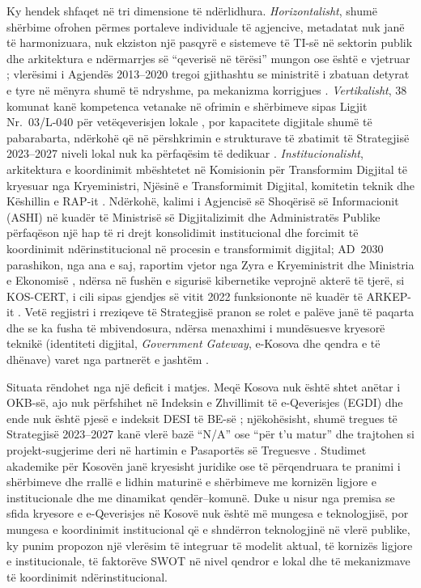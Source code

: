 \documentclass[conference]{IEEEtran}
\begin{document}
Ky hendek shfaqet në tri dimensione të ndërlidhura. \textit{Horizontalisht},
shumë shërbime ofrohen përmes portaleve individuale të agjencive, metadatat
nuk janë të harmonizuara, nuk ekziston një pasqyrë e sistemeve të TI-së në
sektorin publik dhe arkitektura e ndërmarrjes së ``qeverisë në tërësi''
mungon ose është e vjetruar \cite{strategjia2023}; vlerësimi i Agjendës
2013--2020 tregoi gjithashtu se ministritë i zbatuan detyrat e tyre në
mënyra shumë të ndryshme, pa mekanizma korrigjues \cite{agjenda2030}.
\textit{Vertikalisht}, 38 komunat kanë kompetenca vetanake në ofrimin e
shërbimeve sipas Ligjit Nr.~03/L-040 për vetëqeverisjen lokale
\cite{ligji03L040}, por kapacitete digjitale shumë të pabarabarta, ndërkohë
që në përshkrimin e strukturave të zbatimit të Strategjisë 2023--2027 niveli
lokal nuk ka përfaqësim të dedikuar \cite{strategjia2023}.
\textit{Institucionalisht}, arkitektura e koordinimit
mbështetet në Komisionin për Transformim Digjital të
kryesuar nga Kryeministri, Njësinë e Transformimit
Digjital, komitetin teknik dhe Këshillin e RAP-it
\cite{strategjia2023}. Ndërkohë, kalimi i Agjencisë
së Shoqërisë së Informacionit (ASHI) në kuadër të
Ministrisë së Digjitalizimit dhe Administratës Publike
përfaqëson një hap të ri drejt konsolidimit institucional
dhe forcimit të koordinimit ndërinstitucional në
procesin e transformimit digjital; AD~2030 parashikon, nga ana e saj, raportim vjetor
nga Zyra e Kryeministrit dhe Ministria e Ekonomisë \cite{agjenda2030},
ndërsa në fushën e sigurisë kibernetike veprojnë akterë të tjerë, si
KOS-CERT, i cili sipas gjendjes së vitit 2022 funksiononte në kuadër të
ARKEP-it \cite{kipred2022}. Vetë regjistri i rreziqeve
të Strategjisë pranon se rolet e palëve janë të paqarta dhe se ka fusha të
mbivendosura, ndërsa menaxhimi i mundësuesve kryesorë teknikë (identiteti
digjital, \textit{Government Gateway}, e-Kosova dhe qendra e të dhënave)
varet nga partnerët e jashtëm \cite{strategjia2023}.

Situata rëndohet nga një deficit i matjes. Meqë Kosova nuk është shtet
anëtar i OKB-së, ajo nuk përfshihet në Indeksin e Zhvillimit të
e-Qeverisjes (EGDI) \cite{undesa2024} dhe ende nuk është pjesë e indeksit
DESI të BE-së \cite{agjenda2030}; njëkohësisht, shumë tregues të Strategjisë
2023--2027 kanë vlerë bazë ``N/A'' ose ``për t'u matur'' dhe trajtohen si
projekt-sugjerime deri në hartimin e Pasaportës së Treguesve
\cite{strategjia2023}. Studimet akademike për Kosovën janë kryesisht
juridike ose të përqendruara te pranimi i shërbimeve
\cite{dermaku2024,krasniqi2026} dhe rrallë e lidhin maturinë e shërbimeve me
kornizën ligjore e institucionale dhe me dinamikat qendër--komunë. Duke u
nisur nga premisa se sfida kryesore e e-Qeverisjes në Kosovë nuk është më
mungesa e teknologjisë, por mungesa e koordinimit institucional që e
shndërron teknologjinë në vlerë publike, ky punim propozon një vlerësim të
integruar të modelit aktual, të kornizës ligjore e institucionale, të
faktorëve SWOT në nivel qendror e lokal dhe të mekanizmave të koordinimit
ndërinstitucional.
\end{document}
